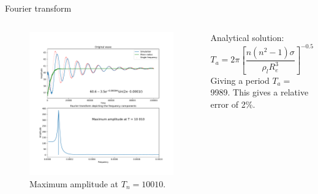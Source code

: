 \documentclass[8pt]{beamer}
\begin{document}
	\begin{frame}{Fourier transform}
		
		\begin{columns}
			
			\begin{figure}[h]
				\centering
				\includegraphics[width=1\linewidth]{pics/fourier.pdf}
				\caption{Maximum amplitude at $T_n = 10010$.}
				\label{fig:2cOsc}
			\end{figure}
			
			Analytical solution:
			\begin{equation}
				T_a = 2 \pi \left[ \frac{n (n^2-1) \sigma}{\rho_l R_e^3} \right]^{-0.5}
			\end{equation}
			Giving a period $T_a = $ 9989. This gives a relative error of 2\%. 
		\end{columns}	
	\end{frame}
	
\end{document}
